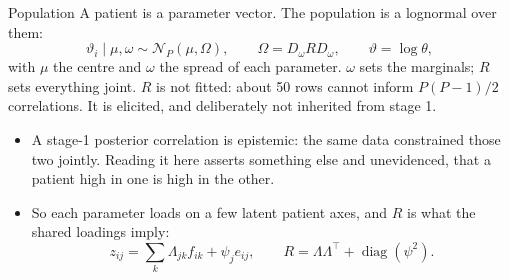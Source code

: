 \documentclass[10pt,aspectratio=169]{beamer}
\newcommand{\Ncal}{\mathcal{N}}
\newcommand{\Tr}{^{\!\top}}
\DeclareMathOperator{\diag}{diag}
\begin{document}
\begin{frame}[t]{Population}
  A patient is a parameter vector. The population is a lognormal over them:
  \[
    \vartheta_i \mid \mu,\omega \sim \Ncal_P(\mu,\Omega),
    \qquad \Omega = D_\omega R D_\omega,
    \qquad \vartheta = \log\theta ,
  \]
  with $\mu$ the centre and $\omega$ the spread of each parameter. $\omega$ sets
  the marginals; $R$ sets everything joint.
  \vfill
  $R$ is not fitted: about 50 rows cannot inform $P(P-1)/2$ correlations. It is
  \alert{elicited}, and deliberately not inherited from stage 1.
  \begin{itemize}\small\setlength\itemsep{5pt}
    \item A stage-1 posterior correlation is epistemic: the same data constrained
      those two jointly. Reading it here asserts something else and unevidenced,
      that a patient high in one is high in the other.
    \item So each parameter loads on a few latent patient axes, and $R$ is what
      the shared loadings imply:
      \[ z_{ij} = \textstyle\sum_k \Lambda_{jk}f_{ik} + \psi_j e_{ij},
         \qquad R = \Lambda\Lambda\Tr + \diag(\psi^2). \]
  \end{itemize}
\end{frame}
\end{document}
